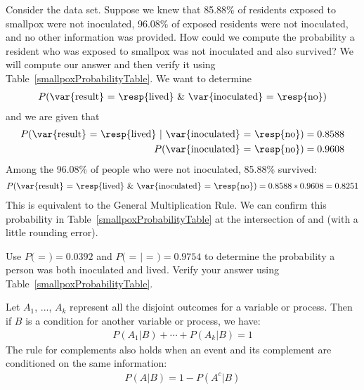 \begin{example}{Consider the  data set. Suppose we knew that 85.88\% of residents exposed to smallpox were not inoculated, 96.08\% of exposed residents were not inoculated, and no other information was provided. How could we compute the probability a resident who was exposed to smallpox was not inoculated and also survived?}
We will compute our answer and then verify it using Table~\ref{smallpoxProbabilityTable}. We want to determine
\begin{eqnarray*}
P(\text{\var{result} = \resp{lived} \& \var{inoculated} = \resp{no}})
\end{eqnarray*}
and we are given that
\begin{eqnarray*}
P(\text{\var{result} = \resp{lived} }|\text{ \var{inoculated} = \resp{no}})=0.8588 \\
P(\text{\var{inoculated} = \resp{no}})=0.9608
\end{eqnarray*}
Among the 96.08\% of people who were not inoculated, 85.88\% survived:
\begin{eqnarray*}
P(\text{\var{result} = \resp{lived} \& \var{inoculated} = \resp{no}}) = 0.8588*0.9608 = 0.8251
\end{eqnarray*}
This is equivalent to the General Multiplication Rule. We can confirm this probability in Table~\vref{smallpoxProbabilityTable} at the intersection of  and  (with a little rounding error).
\end{example}

\begin{exercise}
Use $P($ = $) = 0.0392$ and $P($ =  $|$  = $) = 0.9754$ to determine the probability a person was both inoculated and lived. Verify your answer using Table~\ref{smallpoxProbabilityTable}.
\end{exercise}

\begin{termBox}{
Let $A_1$, ..., $A_k$ represent all the disjoint outcomes for a variable or process. Then if $B$ is a condition for another variable or process, we have: \vspace{-1.5mm}
\begin{eqnarray*}
P(A_1|B)+\cdots+P(A_k|B) = 1
\end{eqnarray*}
The rule for complements also holds when an event and its complement are conditioned on the same information: \vspace{-1.5mm}
\begin{eqnarray*}
P(A | B) = 1 - P(A^c | B)
\end{eqnarray*}}
\end{termBox}

